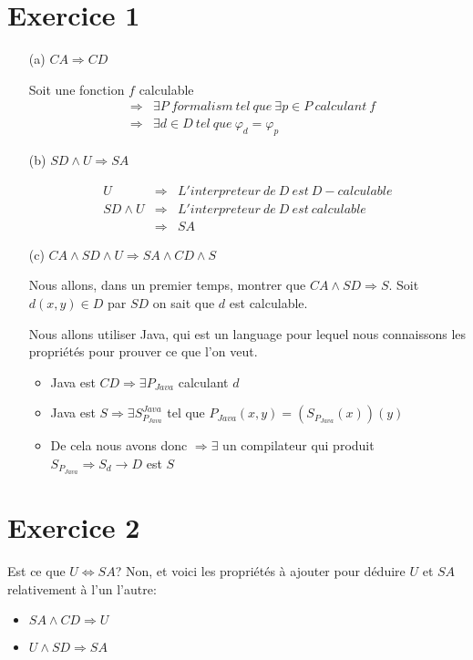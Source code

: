 \documentclass[a4paper, 11pt, onecolumn]{article}
\begin{document}
\section*{Exercice 1}
\begin{itemize}
\item[(a)] $CA \Rightarrow CD$

Soit une fonction $f$ calculable 
\begin{eqnarray*}
&\Rightarrow& \exists P\ formalism\ tel\ que\ \exists p \in P\ calculant\ f\\
&\Rightarrow& \exists d\in D\ tel\ que\ \varphi_d=\varphi_p
\end{eqnarray*}

\item[(b)] $SD \land U \Rightarrow SA$

\begin{eqnarray*}
U &\Rightarrow& L'interpreteur\ de\ D\ est\ D-calculable\\
SD \land U &\Rightarrow& L'interpreteur\ de\ D\ est\ calculable\\
&\Rightarrow& SA
\end{eqnarray*}

\item[(c)] $CA \land SD \land U \Rightarrow SA \land CD \land S$

Nous allons, dans un premier temps, montrer que $CA \land SD \Rightarrow S$. Soit $d(x,y) \in D$ par $SD$ on sait que $d$ est calculable. 

Nous allons utiliser Java, qui est un language pour lequel nous connaissons les propriétés pour prouver ce que l'on veut.

\begin{itemize}
	\item Java est $CD \Rightarrow \exists P_{Java}$ calculant $d$
	\item Java est $S \Rightarrow \exists S^{Java}_{P_{Java}}$ tel que $P_{Java}(x,y) = (S_{P_{Java}}(x))(y)$
	\item De cela nous avons donc $\Rightarrow \exists$ un compilateur qui produit $S_{P_{Java}} \Rightarrow S_d \rightarrow D$ est $S$
\end{itemize}
\end{itemize}

\section*{Exercice 2}

Est ce que $U \Leftrightarrow SA$? Non, et voici les propriétés à ajouter pour déduire $U$ et $SA$ relativement à l'un l'autre:
\begin{itemize}
	\item $SA \land CD \Rightarrow U$
	\item $U \land SD \Rightarrow SA$
\end{itemize}
\end{document}
